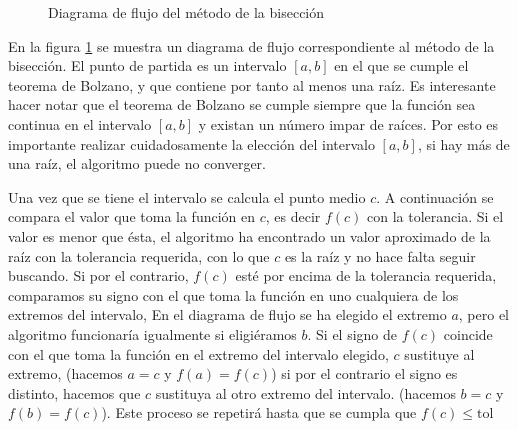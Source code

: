 \begin{figure}[h]
\centering
{}
\caption{Diagrama de flujo del método de la bisección}
\label{fig:dfbisec}
\end{figure}
En la figura \ref{fig:dfbisec} se muestra un diagrama de flujo correspondiente al método de la bisección. El punto de partida es un intervalo $[a,b]$ en el que se cumple el teorema de Bolzano, y que contiene por tanto al menos una raíz. Es interesante hacer notar que el teorema de Bolzano se cumple siempre que la función sea continua en el intervalo $[a,b]$ y existan un número impar de raíces. Por esto es importante realizar cuidadosamente la elección del intervalo $[a,b]$, si hay más de una raíz, el algoritmo puede no converger.

 Una vez que se tiene el intervalo se calcula el punto medio $c$. A continuación se compara el valor que toma la función en $c$, es decir $f(c)$ con la tolerancia. Si el valor es menor que ésta, el algoritmo ha encontrado un valor aproximado de la raíz con la tolerancia requerida, con lo que $c$ es la raíz y no hace falta seguir buscando. Si por el contrario, $f(c)$ esté por encima de la tolerancia requerida, comparamos su signo con el que toma la función en uno cualquiera de los extremos del intervalo, En el diagrama de flujo se ha elegido el extremo $a$, pero el algoritmo funcionaría igualmente si eligiéramos $b$. Si el signo de $f(c)$ coincide con el que toma la función en el extremo del intervalo elegido, $c$ sustituye al extremo, (hacemos $a=c$ y $f(a)=f(c)$) si por el contrario el signo es distinto, hacemos que $c$ sustituya al otro extremo del intervalo. (hacemos $b=c$ y $f(b)=f(c)$). Este proceso se repetirá hasta que se cumpla que $f(c)\le \text{tol}$ 

